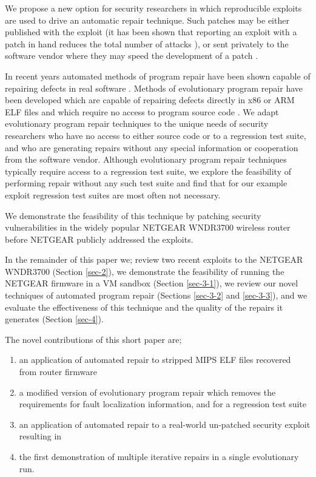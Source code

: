 \documentclass{sigcomm-alternate}
\begin{document}
We propose a new option for security researchers in which reproducible
exploits are used to drive an automatic repair technique.  Such
patches may be either published with the exploit (it has been shown
that reporting an exploit with a patch in hand reduces the total
number of attacks \cite{arora2006does}), or sent privately to the
software vendor where they may speed the development of a patch
\cite{weimer06}.

In recent years automated methods of program repair have been shown
capable of repairing defects in real software \cite{forrest2009genetic,zeller2010,nguyen2013semfix,perkins2009automatically}.
Methods of evolutionary program repair have been developed which are
capable of repairing defects directly in x86 or ARM ELF files and
which require no access to program source code
\cite{schulte2013embedded}.  We adapt evolutionary program repair
techniques to the unique needs of security researchers who have no
access to either source code or to a regression test suite, and who
are generating repairs without any special information or cooperation
from the software vendor.  Although evolutionary program repair
techniques typically require access to a regression test suite, we
explore the feasibility of performing repair without any such test
suite and find that for our example exploit regression test suites are
most often not necessary.

We demonstrate the feasibility of this technique by patching security
vulnerabilities in the widely popular NETGEAR WNDR3700 wireless router
before NETGEAR publicly addressed the exploits.

In the remainder of this paper we; review two recent exploits to the
NETGEAR WNDR3700 (Section \ref{sec-2}), we demonstrate the feasibility
of running the NETGEAR firmware in a VM sandbox (Section \ref{sec-3-1}),
we review our novel techniques of automated program repair (Sections
\ref{sec-3-2} and \ref{sec-3-3}), and we evaluate the effectiveness of this
technique and the quality of the repairs it generates (Section
\ref{sec-4}).

The novel contributions of this short paper are;
\begin{enumerate}
\item an application of automated repair to stripped MIPS ELF files
recovered from router firmware
\item a modified version of evolutionary program repair which removes the
requirements for fault localization information, and for a
regression test suite
\item an application of automated repair to a real-world un-patched
security exploit resulting in
\item the first demonstration of multiple iterative repairs in a single
evolutionary run.
\end{enumerate}
\end{document}

